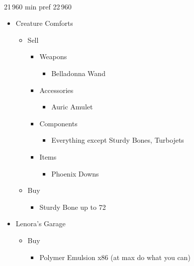 \begin{paracol}{2}
\switchcolumn
\ 
\begin{shop}{21\,960 min pref 22\,960}
\begin{itemize}
    \item Creature Comforts
    \begin{itemize}
        \item Sell
        \begin{itemize}
            \item Weapons
            \begin{itemize}
                \item Belladonna Wand
            \end{itemize}
            \item Accessories
            \begin{itemize}
                \item Auric Amulet
            \end{itemize}
            \item Components
            \begin{itemize}
                \item Everything except Sturdy Bones, Turbojets
            \end{itemize}
            \item Items
            \begin{itemize}
                \item Phoenix Downs
            \end{itemize}
        \end{itemize}
        \item Buy
        \begin{itemize}
            \item Sturdy Bone up to 72
        \end{itemize}
    \end{itemize}
    \item Lenora's Garage
    \begin{itemize}
        \item Buy
        \begin{itemize}
            \item Polymer Emulsion x86 (at max do what you can)
        \end{itemize}
    \end{itemize}
\end{itemize}
\end{shop}
\switchcolumn*
\begin{upgrade}
	\begin{itemize}

\end{itemize}
\end{upgrade}
\end{paracol}
